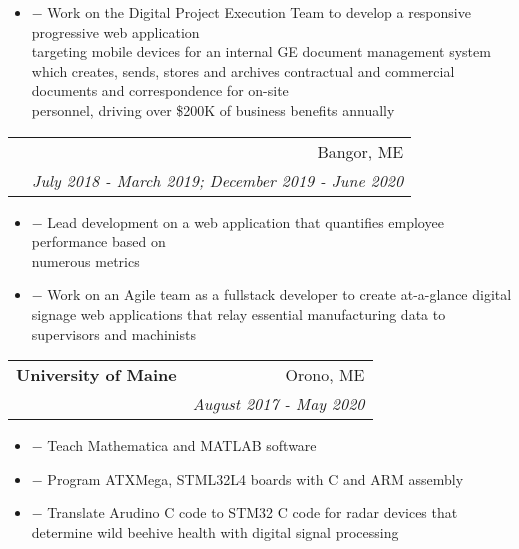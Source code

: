 \documentclass[10pt]{article}
\newcommand{\fancyunderline}[1]{%
    \uline{\phantom{#1}}%
    \llap{\contour{white}{#1}}%
}
\newenvironment{details}
{ \begin{itemize}
    \setlength{\itemsep}{0pt}
    \setlength{\parskip}{0pt}
    \setlength{\parsep}{0pt}     
}
{ \end{itemize}}
\begin{document}
    \begin{details}
        \item[$-$] Work on the Digital Project Execution Team to develop a responsive progressive web application \\ targeting mobile devices for an internal GE document management system which creates, sends, stores and archives contractual and commercial documents and correspondence for on-site \\ personnel, driving over \$200K of business benefits annually 
    \end{details}
    \vspace{-10pt}
    \begin{tabular*}{1.015\textwidth}{l@{\extracolsep{\fill}}r}
        \hspace{-5pt} & Bangor, ME \\
        \hspace{-7.5pt} \fancyunderline{GE Power Early Identification Intern} & \textit{\small July 2018 - March 2019; December 2019 - June 2020} \\
    \end{tabular*}\vspace{-2.5pt}
    \begin{details}
        \item[$-$] Lead development on a web application that quantifies employee performance based on\\ numerous metrics
        \item[$-$] Work on an Agile team as a fullstack developer to create at-a-glance digital signage web applications that relay essential manufacturing data to supervisors and machinists
    \end{details}

\vspace{4pt}
    \begin{tabular*}{1.015\textwidth}{l@{\extracolsep{\fill}}r}
        \hspace{-5pt}\textbf{\large University of Maine} & Orono, ME \\
        \hspace{-7.5pt} \fancyunderline{Teaching \& Research Assistant: College of Electrical and Computer Engineering} & \textit{\small August 2017 - May 2020} \\
    \end{tabular*}\vspace{-2.5pt}
    \begin{details}
        \item[$-$] Teach Mathematica and MATLAB software
        \item[$-$] Program ATXMega, STML32L4 boards with C and ARM assembly
        \item[$-$] Translate Arudino C code to STM32 C code for radar devices that determine wild beehive health with digital signal processing
    \end{details}
\end{document}
